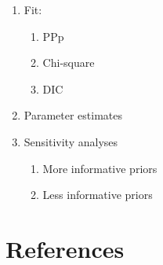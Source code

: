 \documentclass[
  a4paper,
  DIV=11,
  numbers=noendperiod]{scrreprt}
\providecommand{\tightlist}{%
  \setlength{\itemsep}{0pt}\setlength{\parskip}{0pt}}\usepackage{longtable,booktabs,array}
\begin{document}
\begin{enumerate}
\begin{enumerate}
    \begin{enumerate}
    \def\labelenumiii{\arabic{enumiii}.}
    \tightlist
    \item
      First and last box creates polygons for the first and last third
      of the samples
    \end{enumerate}
  \end{enumerate}
\item
  Fit:

  \begin{enumerate}
  \def\labelenumii{\arabic{enumii}.}
  \tightlist
  \item
    PPp
  \item
    Chi-square
  \item
    DIC
  \end{enumerate}
\item
  Parameter estimates
\item
  Sensitivity analyses

  \begin{enumerate}
  \def\labelenumii{\arabic{enumii}.}
  \tightlist
  \item
    More informative priors
  \item
    Less informative priors
  \end{enumerate}
\end{enumerate}


\chapter*{References}\label{references}




\renewcommand\bibname{Appendix A}
  


\printindex
\end{document}
